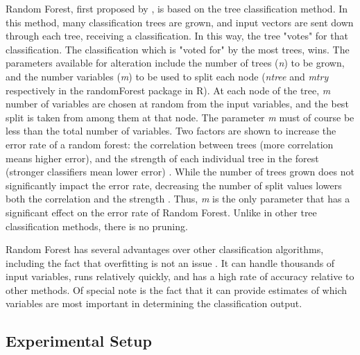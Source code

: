 \documentclass [a4paper,12 pt]{article}
\begin{document}
Random Forest, first proposed by \cite{breiman2001random}, is based on the tree classification method. In this method, many classification trees are grown, and input vectors are sent down through each tree, receiving a classification. In this way, the tree "votes" for that classification. The classification which is "voted for" by the most trees, wins. The parameters available for alteration include the number of trees (\emph{n}) to be grown, and the number variables (\emph{m}) to be used to split each node (\emph{ntree} and \emph{mtry} respectively in the randomForest package in R). At each node of the tree, \emph{m} number of variables are chosen at random from the input variables, and the best split is taken from among them at that node. The parameter \emph{m} must of course be less than the total number of variables. Two factors are shown to increase the error rate of a random forest: the correlation between trees (more correlation means higher error), and the strength of each individual tree in the forest (stronger classifiers mean lower error) \citep{breiman2001random}. While the number of trees grown does not significantly impact the error rate, decreasing the number of split values lowers both the correlation and the strength \citep{breiman2001random}. Thus, \emph{m} is the only parameter that has a significant effect on the error rate of Random Forest. Unlike in other tree classification methods, there is no pruning.

Random Forest has several advantages over other classification algorithms, including the fact that overfitting is not an issue \citep{breimancutlerRF}. It can handle thousands of input variables, runs relatively quickly, and has a high rate of accuracy relative to other methods. Of special note is the fact that it can provide estimates of which variables are most important in determining the classification output. 

\subsection{Experimental Setup}
\end{document}
